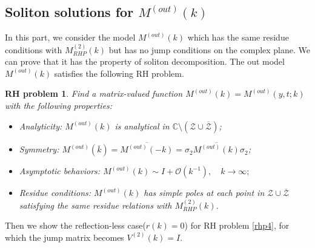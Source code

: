 \documentclass[11pt]{article}
\numberwithin{equation}{section}
\newtheorem{RHP}{RH problem}
\begin{document}
\subsection{\texorpdfstring{Soliton solutions for $M^{(out)}(k)$}{Soliton solutions for M(out)(k)}}\label{subs3.2}
In this part, we consider the model $M^{(out)}(k)$ which has the same residue conditions with $M^{(2)}_{RHP}(k)$ but has no jump conditions on the complex plane. We can prove that it has the property of soliton decomposition. The out model $M^{(out)}(k)$ satisfies the following RH problem.

\begin{RHP}\label{rhp6}
 Find a matrix-valued function $M^{(out)}(k) = M^{(out)}(y, t;k)$ with the following properties:

\begin{itemize}
    \item Analyticity: $M^{(out)}(k)$ is analytical in $\mathbb{C} \setminus (\mathcal{Z} \cup \overline{\mathcal{Z}})$;
    \item Symmetry: $M^{(out)}(\overline{k}) = \overline{M^{(out)}(-k)} = \sigma_2 \overline{M^{(out)}(k) }\sigma_2$;
    \item Asymptotic behaviors: $M^{(out)}(k) \sim I + \mathcal{O}(k^{-1}), \quad k \to \infty; $
    \item Residue conditions: $M^{(out)}(k)$ has simple poles at each point in $\mathcal{Z} \cup \overline{\mathcal{Z}}$ satisfying the same residue relations  with $M_{RHP}^{(2)}(k)$.
\end{itemize}
\end{RHP}


Then we show the reflection-less case($r(k)=0$) for RH problem \ref{rhp4}, for which the jump matrix becomes $V^{(2)}(k)=I$.
\end{document}
